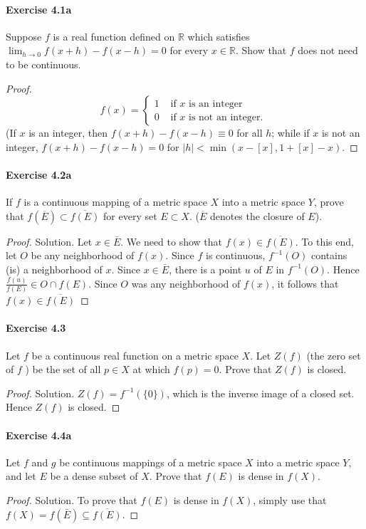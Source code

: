 \documentclass{article}
\theoremstyle{definition}
\begin{document}
\paragraph{Exercise 4.1a} Suppose $f$ is a real function defined on $\mathbb{R}$ which satisfies $\lim_{h \rightarrow 0} f(x + h) - f(x - h) = 0$ for every $x \in \mathbb{R}$. Show that $f$ does not need to be continuous.
\begin{proof}
    $$
f(x)= \begin{cases}1 & \text { if } x \text { is an integer } \\ 0 & \text { if } x \text { is not an integer. }\end{cases}
$$
(If $x$ is an integer, then $f(x+h)-f(x-h) \equiv 0$ for all $h$; while if $x$ is not an integer, $f(x+h)-f(x-h)=0$ for $|h|<\min (x-[x], 1+[x]-x)$.
\end{proof}


\paragraph{Exercise 4.2a} If $f$ is a continuous mapping of a metric space $X$ into a metric space $Y$, prove that $f(\overline{E}) \subset \overline{f(E)}$ for every set $E \subset X$. ($\overline{E}$ denotes the closure of $E$).
\begin{proof}
    Solution. Let $x \in \bar{E}$. We need to show that $f(x) \in \overline{f(E)}$. To this end, let $O$ be any neighborhood of $f(x)$. Since $f$ is continuous, $f^{-1}(O)$ contains (is) a neighborhood of $x$. Since $x \in \bar{E}$, there is a point $u$ of $E$ in $f^{-1}(O)$. Hence $\frac{f(u)}{f(E)} \in O \cap f(E)$. Since $O$ was any neighborhood of $f(x)$, it follows that $f(x) \in \overline{f(E)}$
\end{proof}


\paragraph{Exercise 4.3} Let $f$ be a continuous real function on a metric space $X$. Let $Z(f)$ (the zero set of $f$ ) be the set of all $p \in X$ at which $f(p)=0$. Prove that $Z(f)$ is closed.
\begin{proof}
    Solution. $Z(f)=f^{-1}(\{0\})$, which is the inverse image of a closed set. Hence $Z(f)$ is closed.
\end{proof}


\paragraph{Exercise 4.4a} Let $f$ and $g$ be continuous mappings of a metric space $X$ into a metric space $Y$, and let $E$ be a dense subset of $X$. Prove that $f(E)$ is dense in $f(X)$.
\begin{proof}
    Solution. To prove that $f(E)$ is dense in $f(X)$, simply use that $f(X)=f(\bar{E}) \subseteq \overline{f(E)}$.
\end{proof}
\end{document}
